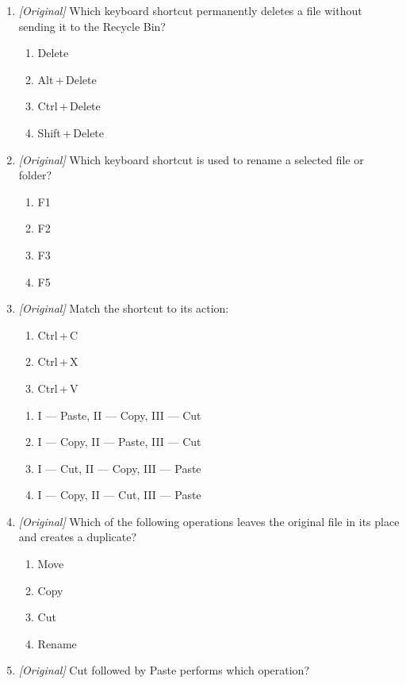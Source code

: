 \begin{enumerate}[label=\textbf{Q\arabic*.}, leftmargin=*]
\item \textit{[Original]} Which keyboard shortcut permanently deletes a file
  without sending it to the Recycle Bin?
  \begin{enumerate}[label=\Alph*.]
    \item Delete
    \item Alt\,+\,Delete
    \item Ctrl\,+\,Delete
    \item Shift\,+\,Delete
  \end{enumerate}
\item \textit{[Original]} Which keyboard shortcut is used to rename a selected
  file or folder?
  \begin{enumerate}[label=\Alph*.]
    \item F1
    \item F2
    \item F3
    \item F5
  \end{enumerate}
\item \textit{[Original]} Match the shortcut to its action:
  \begin{enumerate}[label=\Roman*.]
    \item Ctrl\,+\,C
    \item Ctrl\,+\,X
    \item Ctrl\,+\,V
  \end{enumerate}
  \begin{enumerate}[label=\Alph*.]
    \item I --- Paste, II --- Copy, III --- Cut
    \item I --- Copy, II --- Paste, III --- Cut
    \item I --- Cut, II --- Copy, III --- Paste
    \item I --- Copy, II --- Cut, III --- Paste
  \end{enumerate}
\item \textit{[Original]} Which of the following operations leaves the
  original file in its place and creates a duplicate?
  \begin{enumerate}[label=\Alph*.]
    \item Move
    \item Copy
    \item Cut
    \item Rename
  \end{enumerate}
\item \textit{[Original]} Cut followed by Paste performs which operation?
  \begin{enumerate}[label=\Alph*.]

\end{enumerate}
\end{enumerate}
